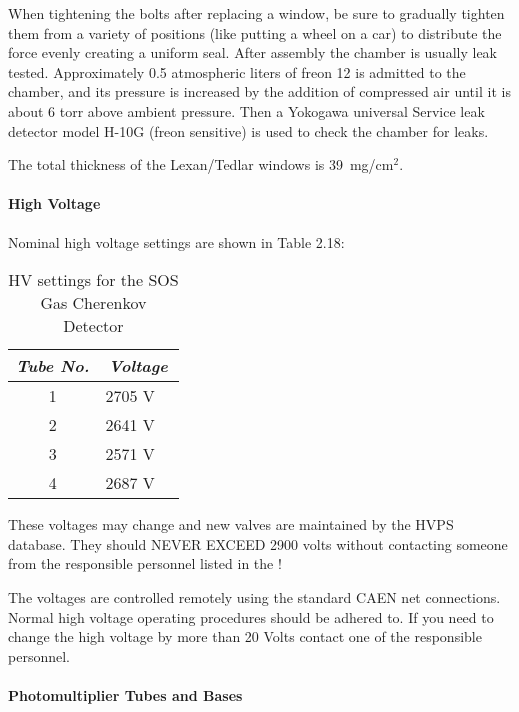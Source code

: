 \begin{obsolete}
	When tightening the bolts after replacing a window, be sure to
gradually tighten them from a variety of positions (like putting a wheel
on a car) to distribute the force evenly creating a uniform seal.  After
assembly the chamber is usually leak tested.  Approximately 0.5
atmospheric liters of freon 12 is admitted to the chamber, and its
pressure is increased by the addition of compressed air until it is
about 6 torr above ambient pressure.  Then a Yokogawa universal Service
leak detector model H-10G (freon sensitive) is used to check the chamber
for leaks.

	The total thickness of the Lexan/Tedlar windows is 39~mg/cm$^{2}$.

\paragraph{High Voltage}

	Nominal high voltage settings are shown in Table 2.18:

\begin{table}
\caption{HV settings for the SOS Gas Cherenkov Detector\label{tab:sos_c_hv}}
\begin{center}
\begin{tabular}{|c|c|r} \hline
{\em Tube No.} &
  \multicolumn{2}{c|}{\em Voltage} \\ \hline
 1  & 2705 V  \\
 2  & 2641 V \\
 3  & 2571 V \\
 4  & 2687 V \\ \hline
\end{tabular}
\end{center}
\end{table}
These voltages may change and new valves are maintained by the HVPS
database.  They should NEVER EXCEED 2900 volts
without contacting someone from the responsible personnel listed
in the !

	The voltages are controlled remotely using the standard CAEN net
connections.  Normal high voltage operating procedures should be
adhered to.  If you need to change the high voltage by more than 20
Volts contact one of the responsible personnel.

\paragraph{Photomultiplier Tubes and Bases}


\end{obsolete}
